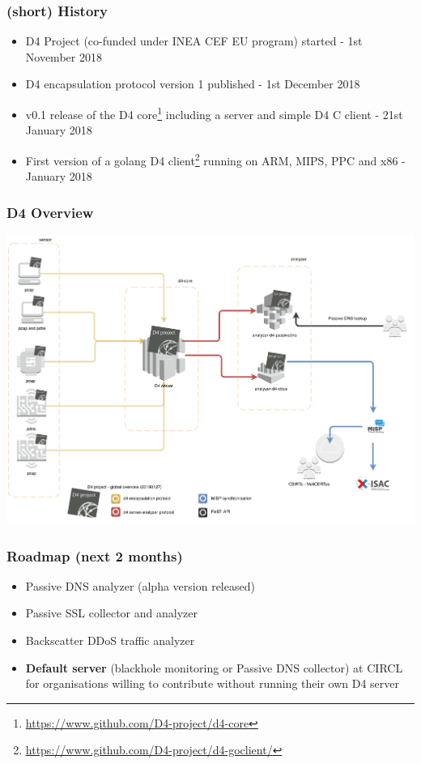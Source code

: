 \documentclass{beamer}
\begin{document}
\begin{frame}
        \frametitle{(short) History}
 \begin{itemize}
        \item D4 Project (co-funded under INEA CEF EU program) started - 1st November 2018
        \item D4 encapsulation protocol version 1 published  - 1st December 2018
        \item v0.1 release of the D4 core\footnote{\url{https://www.github.com/D4-project/d4-core}} including a server and simple D4 C client - 21st January 2018
        \item First version of a golang D4 client\footnote{\url{https://www.github.com/D4-project/d4-goclient/}} running on ARM, MIPS, PPC and x86 - January 2018
 \end{itemize}
\end{frame}

\begin{frame}
\frametitle{D4 Overview}
        \includegraphics[scale=0.38]{d4-overview.pdf}
\end{frame}

\begin{frame}
        \frametitle{Roadmap (next 2 months)}
        \begin{itemize}
                \item Passive DNS analyzer (alpha version released)
                \item Passive SSL collector and analyzer
                \item Backscatter DDoS traffic analyzer
                \item {\bf Default server} (blackhole monitoring or Passive DNS collector) at CIRCL for organisations willing to contribute without running their own D4 server
        \end{itemize}
\end{frame}
\end{document}
